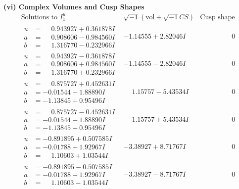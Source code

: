 \documentclass[1p]{elsarticle_modified}
\theoremstyle{definition}
\newcommand{\I}{\sqrt{-1}}
\begin{document}
\newpage\flushleft \textbf{(vi) Complex Volumes and Cusp Shapes}
$$\begin{array}{c|c|c}  
\text{Solutions to }I^u_{1}& \I (\text{vol} + \sqrt{-1}CS) & \text{Cusp shape}\\
 \hline 
\begin{aligned}
u &= \phantom{-}0.943927 + 0.361878 I \\
a &= \phantom{-}0.908606 - 0.984560 I \\
b &= \phantom{-}1.316770 - 0.232966 I\end{aligned}
 & -1.14555 + 2.82046 I & \phantom{-0.000000 } 0 \\ \hline\begin{aligned}
u &= \phantom{-}0.943927 - 0.361878 I \\
a &= \phantom{-}0.908606 + 0.984560 I \\
b &= \phantom{-}1.316770 + 0.232966 I\end{aligned}
 & -1.14555 - 2.82046 I & \phantom{-0.000000 } 0 \\ \hline\begin{aligned}
u &= \phantom{-}0.875727 + 0.452631 I \\
a &= -0.01544 + 1.88890 I \\
b &= -1.13845 + 0.95496 I\end{aligned}
 & \phantom{-}1.15757 - 5.43534 I & \phantom{-0.000000 } 0 \\ \hline\begin{aligned}
u &= \phantom{-}0.875727 - 0.452631 I \\
a &= -0.01544 - 1.88890 I \\
b &= -1.13845 - 0.95496 I\end{aligned}
 & \phantom{-}1.15757 + 5.43534 I & \phantom{-0.000000 } 0 \\ \hline\begin{aligned}
u &= -0.891895 + 0.507585 I \\
a &= -0.01788 + 1.92967 I \\
b &= \phantom{-}1.10603 + 1.03544 I\end{aligned}
 & -3.38927 + 8.71767 I & \phantom{-0.000000 } 0 \\ \hline\begin{aligned}
u &= -0.891895 - 0.507585 I \\
a &= -0.01788 - 1.92967 I \\
b &= \phantom{-}1.10603 - 1.03544 I\end{aligned}
 & -3.38927 - 8.71767 I & \phantom{-0.000000 } 0 \\ \hline\begin{aligned}

\end{aligned}
\end{array}$$
\end{document}
